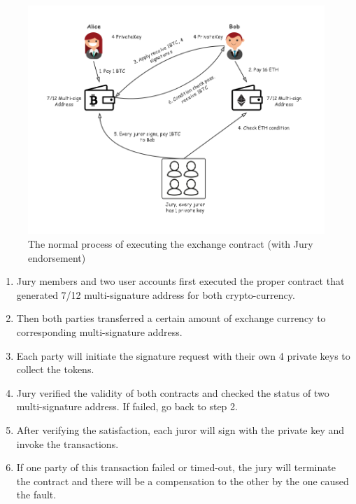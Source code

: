 \begin{figure}[H]
    \includegraphics[width=1\textwidth]{./figures/jury.png}
    \centering
    \caption{The normal process of executing the exchange contract (with Jury endorsement) \protect\footnotemark}
    \label{fig:jury}
    \centering
\end{figure}
\begin{enumerate}
    \item Jury members and two user accounts first executed the proper contract that generated 7/12 multi-signature address for both crypto-currency.
    \item Then both parties transferred a certain amount of exchange currency to corresponding multi-signature address.
    \item Each party will initiate the signature request with their own 4 private keys to collect the tokens.
    \item Jury verified the validity of both contracts and checked the status of two multi-signature address. If failed, go back to step 2.
    \item After verifying the satisfaction, each juror will sign with the private key and invoke the transactions.
    \item If one party of this transaction failed or timed-out, the jury will terminate the contract and there will be a compensation to the other by the one caused the fault.
\end{enumerate}
